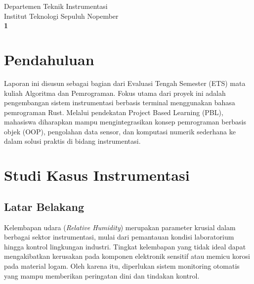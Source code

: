 \documentclass[12pt,a4paper]{article}
\begin{document}
\begin{titlepage}
    \vfill
    
    {\large Departemen Teknik Instrumentasi} \\[0.1cm]
    {\large Institut Teknologi Sepuluh Nopember} \\[1cm]
    
    \textbf{1} 
\end{titlepage}

\newpage
\tableofcontents
\newpage


\section{Pendahuluan}
Laporan ini disusun sebagai bagian dari Evaluasi Tengah Semester (ETS) mata kuliah Algoritma dan Pemrograman. Fokus utama dari proyek ini adalah pengembangan sistem instrumentasi berbasis terminal menggunakan bahasa pemrograman Rust. Melalui pendekatan Project Based Learning (PBL), mahasiswa diharapkan mampu mengintegrasikan konsep pemrograman berbasis objek (OOP), pengolahan data sensor, dan komputasi numerik sederhana ke dalam solusi praktis di bidang instrumentasi.

\section{Studi Kasus Instrumentasi}
\subsection{Latar Belakang}
Kelembapan udara (\textit{Relative Humidity}) merupakan parameter krusial dalam berbagai sektor instrumentasi, mulai dari pemantauan kondisi laboratorium hingga kontrol lingkungan industri. Tingkat kelembapan yang tidak ideal dapat mengakibatkan kerusakan pada komponen elektronik sensitif atau memicu korosi pada material logam. Oleh karena itu, diperlukan sistem monitoring otomatis yang mampu memberikan peringatan dini dan tindakan kontrol.
\end{document}
